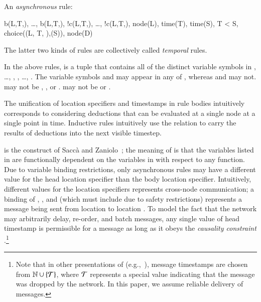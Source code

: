 An {\em asynchronous} rule:

\begin{Drules}
        {b(L,T,), \ldots, b(L,T,),
          !c(L,T,), \ldots, !c(L,T,),
          node(L), time(T), time(S), T < S, choice((L, T, ),(S)), node(D)}
\end{Drules}

The latter two kinds of rules are collectively called {\em temporal} rules.

In the above rules,  is a tuple that contains all of the distinct variable
symbols in , \ldots, , , \ldots,
.  The variable symbols  and  may appear in
any of , whereas  and  may not.
 may not be , , or .
 may not be
 or .

The unification of location specifiers and timestamps in rule bodies intuitively corresponds to considering deductions that can be evaluated at a single node at a single point in time.  Inductive rules intuitively use the  relation to carry the results of deductions into the next visible timestep.

 is the construct of Sacc\`{a} and Zaniolo~\cite{sacca-zaniolo};
the meaning of  is that the variables listed
in  are functionally dependent on the variables in  with respect to
any function.  Due to variable binding restrictions, only asynchronous rules may
have a different value for the head location specifier than the body location
specifier.  Intuitively, different values for the location specifiers represents
cross-node communication; a binding of , , and 
(which must include  due to safety restrictions) represents a message
being sent from location  to location .  To model the fact
that the network may arbitrarily delay, re-order, and batch messages, any single
value of head timestamp  is permissible for a message as long as it
obeys the {\em causality constraint} .\footnote{Note that in
  other presentations of \lang (e.g.,~\cite{dedalus}), message timestamps are
  chosen from $\mathbb{N} \cup \{\Tau\}$, where $\Tau$ represents a special value
  indicating that the message was dropped by the network. In this paper, we
  assume reliable delivery of messages.}

